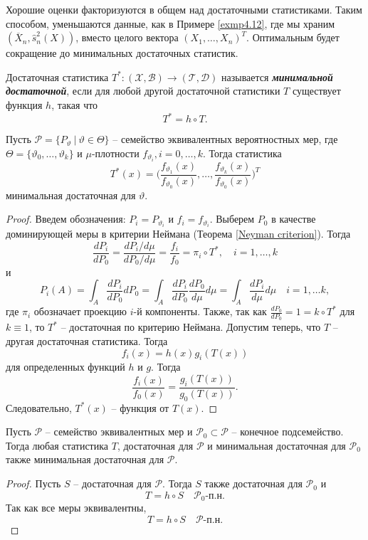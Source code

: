 \begin{rmrk}
	Хорошие оценки факторизуются в общем над достаточными статистиками. Таким способом, уменьшаются данные, как в Примере \ref{exmp4.12}, где мы храним $(\overline{X}_n, \hat{s}_n^2(X))$, вместо целого вектора $(X_1, \dots, X_n)^T$. Оптимальным будет сокращение до минимальных достаточных статистик. 
\end{rmrk}

\begin{defn}
	Достаточная статистика $T^*:(\mathcal{X}, \mathcal{B}) \rightarrow (\mathcal{T}, \mathcal{D})$ называется \textbf{\textit{минимальной достаточной}}, если для любой другой достаточной статистики $T$ существует функция $h$, такая что
	\[T^*=h \circ T. \]
\end{defn}

\begin{exmp} \label{exmp4.20}
	Пусть $\mathcal{P} = \{P_\vartheta\ |\ \vartheta \in \Theta\}$ -- семейство эквивалентных вероятностных мер, где $\Theta = \{\vartheta_0, \dots, \vartheta_k\}$ и $\mu$-плотности $f_{\vartheta_i}, i = 0, \dots, k$. Тогда статистика
	\[ T^*(x) = \bigg(\frac{f_{\vartheta_1}(x)}{f_{\vartheta_0}(x)}, \dots, \frac{f_{\vartheta_k}(x)}{f_{\vartheta_0}(x)}\bigg)^T \]
	минимальная достаточная для $\vartheta$.
\end{exmp}
\begin{proof}
	Введем обозначения: $P_i = P_{\vartheta_i}$ и $f_i = f_{\vartheta_i}$. Выберем $P_0$ в качестве доминирующей меры в критерии Неймана (Теорема \ref{Neyman criterion}). Тогда
	\[ \frac{dP_i}{dP_0} = \frac{dP_i / d\mu}{dP_0 / d\mu} = \frac{f_i}{f_0} = \pi_i \circ T^*, \quad i = 1, \dots, k \]
	и
	\[ P_i(A) = \int_A \frac{dP_i}{dP_0} dP_0 = \int_A \frac{dP_i}{dP_0} \frac{dP_0}{d\mu} d\mu = \int_A \frac{dP_i}{d\mu} d\mu \quad i = 1, \dots k, \]
	где $\pi_i$ обозначает проекцию $i$-й компоненты. Также, так как $\frac{dP_0}{dP_0} = 1 = k \circ T^*$ для $k \equiv 1$, то $T^*$ -- достаточная по критерию Неймана. Допустим теперь, что $T$ -- другая достаточная статистика. Тогда
	\[ f_i(x) = h(x) g_i(T(x)) \]
	для определенных функций $h$ и $g$. Тогда
	\[\frac{f_i(x)}{f_0(x)} = \frac{g_i(T(x))}{g_0(T(x))}. \]
	Следовательно, $T^*(x)$ -- функция от $T(x)$.
\end{proof}

\begin{lmm} \label{lmm4.21}
	Пусть $\mathcal{P}$ -- семейство эквивалентных мер и $\mathcal{P}_0 \subset \mathcal{P}$ -- конечное подсемейство. Тогда любая статистика $T$, достаточная для $\mathcal{P}$ и минимальная достаточная для $\mathcal{P}_0$ также минимальная достаточная для $\mathcal{P}$.
\end{lmm}
\begin{proof}
	Пусть $S$ -- достаточная для $\mathcal{P}$. Тогда $S$ также достаточная для $\mathcal{P}_0$ и
	\[ T = h \circ S \quad \mathcal{P}_0\text{-п.н.} \]
	Так как все меры эквивалентны, 
	\[ T = h \circ S \quad \mathcal{P}\text{-п.н.} \]
\end{proof}

